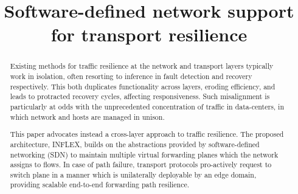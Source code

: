 \documentclass[conference]{IEEEtran}
\begin{document}
\title{Software-defined network support for transport resilience}



\author{
}

\maketitle

\maketitle
\begin{abstract}
Existing methods for traffic resilience at the network and transport layers typically work in isolation, often resorting to inference in fault detection and recovery respectively.
This both duplicates functionality across layers, eroding efficiency, and leads to protracted recovery cycles, affecting responsiveness.
Such misalignment is particularly at odds with the unprecedented concentration of traffic in data-centers, in which network and hosts are managed in unison.

This paper advocates instead a cross-layer approach to traffic resilience.
The proposed architecture, INFLEX, builds on the abstractions provided by software-defined networking (SDN) to maintain multiple virtual forwarding planes which the network assigns to flows.
In case of path failure, transport protocols pro-actively request to switch plane in a manner which is unilaterally deployable by an edge domain, providing scalable end-to-end forwarding path resilience.


\end{abstract}









{\footnotesize }
\end{document}
